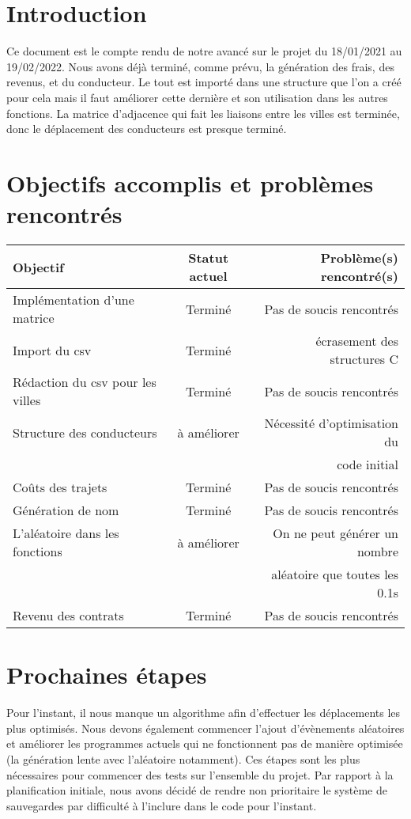 \documentclass[a4paper, 12pt]{article}
\begin{document}
\newpage



\section*{Introduction}
      Ce document est le compte rendu de notre avancé sur le projet du 18/01/2021 au 19/02/2022. Nous avons déjà terminé, comme prévu, la génération des frais, des revenus, et du conducteur. Le tout est importé dans une structure que l'on a créé pour cela mais il faut améliorer cette dernière et son utilisation dans les autres fonctions. 
      La matrice d'adjacence qui fait les liaisons entre les villes est terminée, donc le déplacement des conducteurs est presque terminé.

\section{Objectifs accomplis et problèmes rencontrés}
     \begin{tabular}{|l|c|r|}
  \hline
  Objectif & Statut actuel & Problème(s) rencontré(s) \\
  \hline
  Implémentation d'une matrice & Terminé & Pas de soucis rencontrés \\
  Import du csv & Terminé & écrasement des structures C \\
  Rédaction du csv pour les villes & Terminé & Pas de soucis rencontrés\\
  Structure des conducteurs & à améliorer & Nécessité d'optimisation du \\&& code initial\\
  Coûts des trajets & Terminé & Pas de soucis rencontrés\\
  Génération de nom & Terminé & Pas de soucis rencontrés\\
  L'aléatoire dans les fonctions & à améliorer & On ne peut générer un nombre \\&& aléatoire que toutes les 0.1s\\
  Revenu des contrats & Terminé & Pas de soucis rencontrés\\

  \hline
\end{tabular}
\section{Prochaines étapes}
     Pour l'instant, il nous manque un algorithme afin d'effectuer les déplacements les plus optimisés. Nous devons également commencer l'ajout d'évènements aléatoires et améliorer les programmes actuels qui ne fonctionnent pas de manière optimisée (la génération lente avec l'aléatoire notamment). 
     Ces étapes sont les plus nécessaires pour commencer des tests sur l'ensemble du projet. 
     Par rapport à la planification initiale, nous avons décidé de rendre non prioritaire le système de sauvegardes par difficulté à l'inclure dans le code pour l'instant.
    
\end{document}
